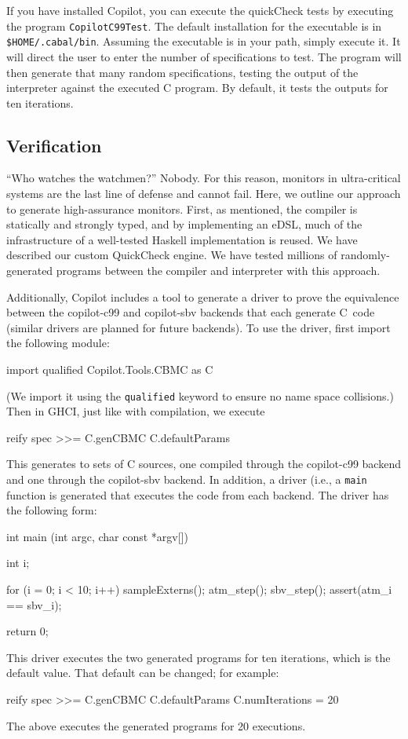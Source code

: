 \documentclass[]{article}
\theoremstyle{example}
\begin{document}
If you have installed Copilot, you can execute the quickCheck tests by executing
the program {\tt CopilotC99Test}.  The default installation for the executable
is in {\tt \$HOME/.cabal/bin}. Assuming the executable is in your path, simply
execute it.  It will direct the user to enter the number of specifications to
test.  The program will then generate that many random specifications, testing
the output of the interpreter against the executed C program.  By default, it
tests the outputs for ten iterations.


\subsection{Verification}
``Who watches the watchmen?''  Nobody.  For this reason, monitors in
ultra-critical systems are the last line of defense and cannot fail.  Here, we
outline our approach to generate high-assurance monitors.  First, as mentioned,
the compiler is statically and strongly typed, and by implementing an eDSL, much
of the infrastructure of a well-tested Haskell implementation is reused.  We
have described our custom QuickCheck engine.  We have tested millions of
randomly-generated programs between the compiler and interpreter with this approach.

Additionally, Copilot includes a tool to generate a driver to prove the
equivalence between the copilot-c99 and copilot-sbv backends that each generate
C~code (similar drivers are planned for future backends).  To use the driver,
first import the following module:
%
\begin{code}
import qualified Copilot.Tools.CBMC as C
\end{code}
%
\noindent
(We import it using the {\tt qualified} keyword to ensure no name space
collisions.)  Then in GHCI, just like with compilation, we execute
%
\begin{code}
reify spec >>= C.genCBMC C.defaultParams  
\end{code}
%
\noindent
This generates to sets of C sources, one compiled through the copilot-c99
backend and one through the copilot-sbv backend.  In addition, a driver (i.e., a
{\tt main} function is generated that executes the code from each backend.  The
driver has the following form:
%
\begin{code}
int main (int argc, char const *argv[])
{
  int i;

  for (i = 0; i < 10; i++)
  {
    sampleExterns();
    atm_step();
    sbv_step();
    assert(atm_i == sbv_i);
  }

  return 0;
}
\end{code}
%
This driver executes the two generated programs for ten iterations, which is the
default value.  That default can be changed; for example:
%
\begin{code}
reify spec >>= 
  C.genCBMC C.defaultParams {C.numIterations = 20}
\end{code}
%
\noindent
The above executes the generated programs for 20 executions.
\end{document}
